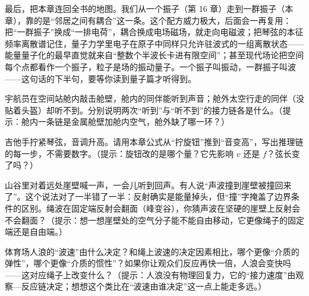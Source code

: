\begin{mainline}
最后，把本章连回全书的地图。我们从一个振子（第 16 章）走到一群振子（本章），靠的是“邻居之间有耦合”这一条。这个配方威力极大，后面会一再复用：把“一群振子”换成“一排电荷”，耦合换成电场磁场，就走向电磁波；把琴弦的本征频率离散谱记住，量子力学里电子在原子中同样只允许驻波式的一组离散状态——能量量子化的最早直觉就来自“整数个半波长卡进有限空间”；甚至现代场论把空间每个点都看作一个振子，粒子是场的振动量子。一个振子叫振动，一群振子叫波——这句话的下半句，要等你读到量子篇才听得到。
\end{mainline}

\begin{puzzles}
  \item 宇航员在空间站舱内敲击舱壁，舱内的同伴能听到声音；舱外太空行走的同伴（没贴着头盔）却听不到。分别说明两次“听到”与“听不到”的接力链各是什么。（提示：舱内一条链是金属舱壁加舱内空气，舱外缺了哪一环？）
  \item 吉他手拧紧琴弦，音调升高。请用本章公式从“拧旋钮”推到“音变高”，写出推理链的每一步，不需要数字。（提示：旋钮改的是哪个量？它先影响 \(v\) 还是 \(f\)？弦长变了吗？）
  \item 山谷里对着远处崖壁喊一声，一会儿听到回声。有人说“声波撞到崖壁被撞回来了”。这个说法对了一半错了一半：反射确实是能量掉头，但“撞”字掩盖了边界条件的区别。绳波在固定端反射会翻面（峰变谷），你猜声波在坚硬的崖壁上反射会不会翻面？（提示：想一想崖壁处的空气分子能不能自由移动，它更像绳子的固定端还是自由端。）
  \item 体育场人浪的“波速”由什么决定？和绳上波速的决定因素相比，哪个更像“介质的弹性”，哪个更像“介质的惯性”？如果你让观众们反应再快一倍，人浪会变快吗——这对应绳子上改变什么？（提示：人浪没有物理回复力，它的“接力速度”由观察—反应链决定；想想这个类比在“波速由谁决定”这一点上能走多远。）
\end{puzzles}
